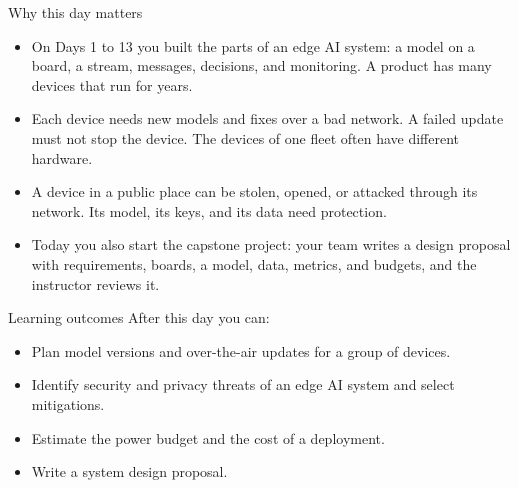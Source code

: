 \begin{frame}{Why this day matters}
  \begin{itemize}
    \item On Days 1 to 13 you built the parts of an edge AI system: a model on
          a board, a stream, messages, decisions, and monitoring. A product
          has many devices that run for years.
    \item Each device needs new models and fixes over a bad network. A failed
          update must not stop the device. The devices of one fleet often have
          different hardware.
    \item A device in a public place can be stolen, opened, or attacked
          through its network. Its model, its keys, and its data need
          protection.
    \item Today you also start the capstone project: your team writes a design
          proposal with requirements, boards, a model, data, metrics, and
          budgets, and the instructor reviews it.
  \end{itemize}
\end{frame}

\begin{frame}{Learning outcomes}
  After this day you can:
  \begin{itemize}
    \item Plan model versions and over-the-air updates for a group of devices.
    \item Identify security and privacy threats of an edge AI system and
          select mitigations.
    \item Estimate the power budget and the cost of a deployment.
    \item Write a system design proposal.
  \end{itemize}
\end{frame}
